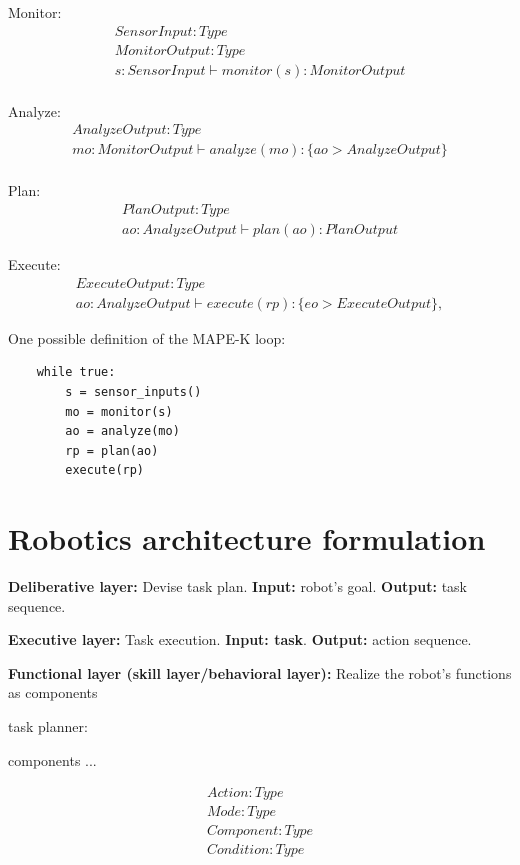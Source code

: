Monitor:
\begin{gather}
    SensorInput : Type \\
    MonitorOutput: Type \\
    s: SensorInput \vdash monitor(s) : MonitorOutput \\
\end{gather}

Analyze:
\begin{gather}
    AnalyzeOutput: Type \\
    mo : MonitorOutput \vdash analyze(mo) : \{ ao>AnalyzeOutput \}\\
\end{gather}


Plan:
\begin{gather}
    PlanOutput: Type \\
    ao: AnalyzeOutput \vdash plan(ao) : PlanOutput 
\end{gather}

Execute:
\begin{gather}
    ExecuteOutput : Type \\
    ao : AnalyzeOutput \vdash execute(rp) : \{ eo>ExecuteOutput \}, 
\end{gather}

One possible definition of the MAPE-K loop:
\begin{lstlisting}
    while true:
        s = sensor_inputs()
        mo = monitor(s)
        ao = analyze(mo)
        rp = plan(ao)
        execute(rp)
\end{lstlisting}

\section{Robotics architecture formulation}

\textbf{Deliberative layer:} Devise task plan. \textbf{Input:} robot's goal. \textbf{Output:} task sequence.

\textbf{Executive layer:} Task execution. \textbf{Input: task}. \textbf{Output:} action sequence.

\textbf{Functional layer (skill layer/behavioral layer):} Realize the robot's functions as components

task planner:

components ...

\begin{gather}
    Action: Type \\
    Mode: Type \\
    Component: Type \\
    Condition: Type 
\end{gather}


